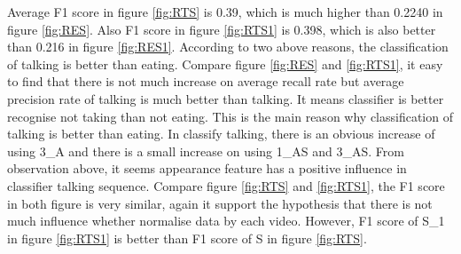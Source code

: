 Average F1 score in figure \ref{fig:RTS} is 0.39, which is much higher than 0.2240 in figure \ref{fig:RES}. Also F1 score in figure \ref{fig:RTS1} is 0.398, which is also better than 0.216 in figure \ref{fig:RES1}. According to two above reasons, the classification of talking is better than eating. Compare figure \ref{fig:RES} and \ref{fig:RTS1}, it easy to find that there is not much increase on average recall rate but average precision rate of talking is much better than talking. It means classifier is better recognise not taking than not eating. This is the main reason why classification of talking is better than eating. In classify talking, there is an obvious increase of using 3\_A and there is a small increase on using 1\_AS and 3\_AS. From observation above, it seems appearance feature has a positive influence in classifier talking sequence. Compare figure \ref{fig:RTS} and \ref{fig:RTS1}, the F1 score in both figure is very similar, again it support the hypothesis that there is not much influence whether normalise data by each video. However, F1 score of S\_1 in figure \ref{fig:RTS1} is better than F1 score of S in figure \ref{fig:RTS}.
